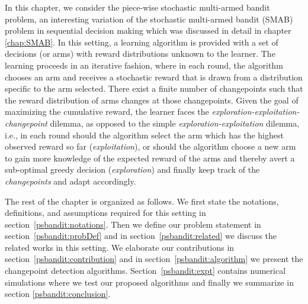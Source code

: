 In this chapter, we consider the piece-wise stochastic multi-armed bandit problem, an interesting variation of the stochastic multi-armed bandit (SMAB) problem in sequential decision making which was discussed in detail in chapter \ref{chap:SMAB}. In this setting,  a learning algorithm is provided with a set of decisions (or arms) with reward distributions unknown to the learner. The learning proceeds in an iterative fashion, where in each round, the algorithm chooses an arm and receives a stochastic reward that is drawn from a distribution specific to the arm selected. There exist a finite number of changepoints such that the reward distribution of arms changes at those changepoints. Given the goal of maximizing the cumulative reward, the learner faces the \textit{exploration-exploitation-changepoint} dilemma, as opposed to the simple \textit{exploration-exploitation} dilemma, i.e., in each round should the algorithm select the arm which has the highest observed reward so far (\textit{exploitation}), or should the algorithm choose a new arm to gain more knowledge of the expected reward of the arms and thereby avert a sub-optimal greedy decision (\textit{exploration}) and finally keep track of the \textit{changepoints} and adapt accordingly.

    The rest of the chapter is organized as follows. We first state the notations, definitions, and assumptions required for this setting in section~\ref{psbandit:notations}. Then we define our problem statement in section~\ref{psbandit:probDef} and in section~\ref{psbandit:related} we discuss the related works in this setting. We elaborate our contributions in section~\ref{psbandit:contribution} and in section~\ref{psbandit:algorithm} we present the changepoint detection algorithms. Section~\ref{psbandit:expt} contains numerical simulations where we test our proposed algorithms and finally we summarize in section \ref{psbandit:conclusion}. 

